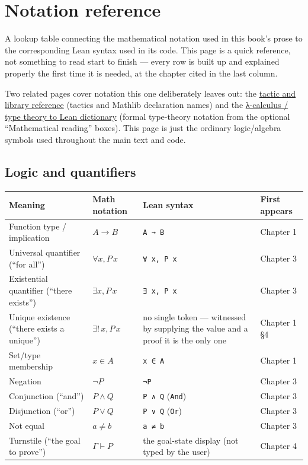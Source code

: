 \chapter*{Notation reference}
\setcounter{section}{0}\label{sec:root:notation-reference:1}

A lookup table connecting the mathematical notation used in this book's prose to the corresponding Lean syntax used in its code. This page is a quick reference, not something to read start to finish --- every row is built up and explained properly the first time it is needed, at the chapter cited in the last column.

Two related pages cover notation this one deliberately leaves out: the \hyperref[sec:root:tactic-and-library-reference:1]{tactic and library reference} (tactics and Mathlib declaration names) and the \hyperref[sec:root:lambda-calculus-dictionary:1]{λ-calculus / type theory to Lean dictionary} (formal type-theory notation from the optional ``Mathematical reading'' boxes). This page is just the ordinary logic/algebra symbols used throughout the main text and code.

\section{Logic and quantifiers}\label{sec:root:notation-reference:2}

{\small\begin{tabular}{
  >{\raggedright\arraybackslash}p{}
  >{\raggedright\arraybackslash}p{}
  >{\raggedright\arraybackslash}p{}
  >{\raggedright\arraybackslash}p{}
}
\toprule
Meaning & Math notation & Lean syntax & First appears \\
\midrule
Function type / implication & \(A \to B\) & \texttt{A → B} & Chapter 1 \\
Universal quantifier (``for all'') & \(\forall x, P\, x\) & \texttt{∀ x, P x} & Chapter 3 \\
Existential quantifier (``there exists'') & \(\exists x, P\, x\) & \texttt{∃ x, P x} & Chapter 3 \\
Unique existence (``there exists a unique'') & \(\exists!\, x, P\, x\) & no single token --- witnessed by supplying the value and a proof it is the only one & Chapter 1 §4 \\
Set/type membership & \(x \in A\) & \texttt{x ∈ A} & Chapter 1 \\
Negation & \(\neg P\) & \texttt{¬P} & Chapter 3 \\
Conjunction (``and'') & \(P \wedge Q\) & \texttt{P ∧ Q} (\texttt{And}) & Chapter 3 \\
Disjunction (``or'') & \(P \vee Q\) & \texttt{P ∨ Q} (\texttt{Or}) & Chapter 3 \\
Not equal & \(a \neq b\) & \texttt{a ≠ b} & Chapter 3 \\
Turnstile (``the goal to prove'') & \(\Gamma \vdash P\) & the goal-state display (not typed by the user) & Chapter 4 \\
\bottomrule
\end{tabular}}


